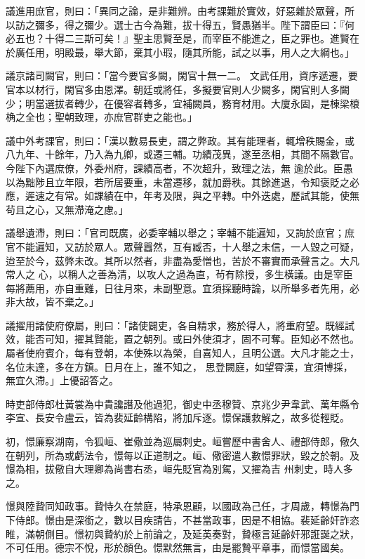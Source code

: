 \begin{pinyinscope}
 議進用庶官，則曰：「異同之論，是非難辨。由考課難於實效，好惡雜於眾聲，所以訪之彌多，得之彌少。選士古今為難，拔十得五，賢愚猶半。陛下謂臣曰：『何必五也？十得二三斯可矣！』聖主思賢至是，而宰臣不能進之，臣之罪也。進賢在於廣任用，明殿最，舉大節，棄其小瑕，隨其所能，試之以事，用人之大綱也。」



 議京諸司闕官，則曰：「當今要官多闕，閑官十無一二。
 文武任用，資序遞遷，要官本以材行，閑官多由恩澤。朝廷或將任，多擬要官則人少闕多，閑官則人多闕少；明當選拔者轉少，在優容者轉多，宜補闕員，務育材用。大廈永固，是棟梁榱桷之全也；聖朝致理，亦庶官群吏之能也。」



 議中外考課官，則曰：「漢以數易長吏，謂之弊政。其有能理者，輒增秩賜金，或八九年、十餘年，乃入為九卿，或遷三輔。功績茂異，遂至丞相，其間不隔數官。今陛下內選庶僚，外委州府，課績高者，不次超升，致理之法，無
 逾於此。臣愚以為黜陟且立年限，若所居要重，未當遷移，就加爵秩。其餘進退，令知褒貶之必應，遲速之有常。如課績在中，年考及限，與之平轉。中外迭處，歷試其能，使無茍且之心，又無滯淹之慮。」



 議舉遺滯，則曰：「官司既廣，必委宰輔以舉之；宰輔不能遍知，又詢於庶官；庶官不能遍知，又訪於眾人。眾聲囂然，互有臧否，十人舉之未信，一人毀之可疑，迨至於今，茲弊未改。其所以然者，非盡為愛憎也，苦於不審實而承聲言之。大凡常人之
 心，以稱人之善為清，以攻人之過為直，茍有除授，多生橫議。由是宰臣每將薦用，亦自重難，日往月來，未副聖意。宜須採聽時論，以所舉多者先用，必非大故，皆不棄之。」



 議擢用諸使府僚屬，則曰：「諸使闢吏，各自精求，務於得人，將重府望。既經試效，能否可知，擢其賢能，置之朝列。或曰外使須才，固不可奪。臣知必不然也。屬者使府賓介，每有登朝，本使殊以為榮，自喜知人，且明公選。大凡才能之士，名位未達，多在方鎮。日月在上，誰不知之，
 思登闕庭，如望霄漢，宜須博採，無宜久滯。」上優詔答之。



 時吏部侍郎杜黃裳為中貴讒譖及他過犯，御史中丞穆贊、京兆少尹韋武、萬年縣令李宣、長安令盧云，皆為裴延齡構陷，將加斥逐。憬保護救解之，故多從輕貶。



 初，憬廉察湖南，令狐峘、崔儆並為巡屬刺史。峘嘗歷中書舍人、禮部侍郎，儆久在朝列，所為或虧法令，憬每以正道制之。峘、儆密遣人數憬罪狀，毀之於朝。及憬為相，拔儆自大理卿為尚書右丞，峘先貶官為別駕，又擢為吉
 州刺史，時人多之。



 憬與陸贄同知政事。贄恃久在禁庭，特承恩顧，以國政為己任，才周歲，轉憬為門下侍郎。憬由是深銜之，數以目疾請告，不甚當政事，因是不相協。裴延齡奸詐恣睢，滿朝側目。憬初與贄約於上前論之，及延英奏對，贄極言延齡奸邪誑誕之狀，不可任用。德宗不悅，形於顏色。憬默然無言，由是罷贄平章事，而憬當國矣。




\end{pinyinscope}
